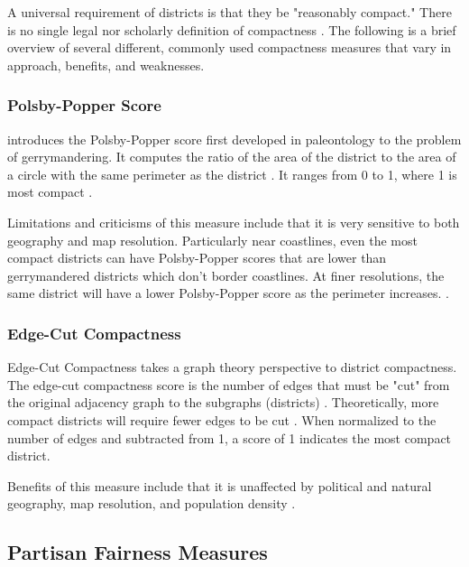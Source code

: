 A universal requirement of districts is that they be "reasonably compact." There is no single legal nor scholarly definition of compactness \parencite{katz2020}. The following is a brief overview of several different, commonly used compactness measures that vary in approach, benefits, and weaknesses.

\subsubsection{Polsby-Popper Score}
\label{sec:polsbypopper}

\textcite{polsby1991} introduces the Polsby-Popper score first developed in paleontology to the problem of gerrymandering. It computes the ratio of the area of the district to the area of a circle with the same perimeter as the district \parencite{cox1927,polsby1991}. It ranges from 0 to 1, where 1 is most compact \parencite{polsby1991}.

Limitations and criticisms of this measure include that it is very sensitive to both geography and map resolution. Particularly near coastlines, even the most compact districts can have Polsby-Popper scores that are lower than gerrymandered districts which don't border coastlines. At finer resolutions, the same district will have a lower Polsby-Popper score as the perimeter increases. \parencite[12]{mccartan2020}.

\subsubsection{Edge-Cut Compactness}
\label{sec:edgecut}

Edge-Cut Compactness takes a graph theory perspective to district compactness. The edge-cut compactness score is the number of edges that must be "cut" from the original adjacency graph to the subgraphs (districts) \parencite{dube2016}. Theoretically, more compact districts will require fewer edges to be cut \parencite{dube2016}. When normalized to the number of edges and subtracted from 1, a score of 1 indicates the most compact district. 

Benefits of this measure include that it is unaffected by political and natural geography, map resolution, and population density \parencite[11]{mccartan2020}. 

\subsection{Partisan Fairness Measures}

